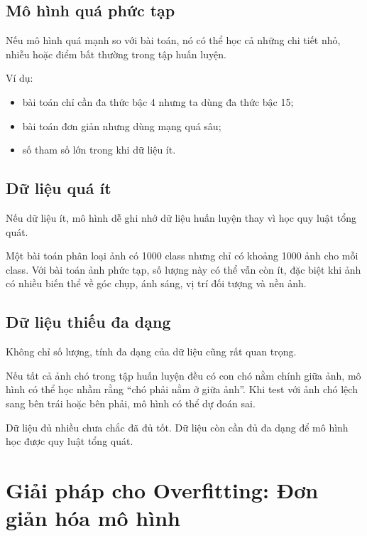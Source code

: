\subsection{Mô hình quá phức tạp}

Nếu mô hình quá mạnh so với bài toán, nó có thể học cả những chi tiết nhỏ, nhiễu hoặc điểm bất thường trong tập huấn luyện.

Ví dụ:

\begin{itemize}
    \item bài toán chỉ cần đa thức bậc 4 nhưng ta dùng đa thức bậc 15;
    \item bài toán đơn giản nhưng dùng mạng quá sâu;
    \item số tham số lớn trong khi dữ liệu ít.
\end{itemize}

\subsection{Dữ liệu quá ít}

Nếu dữ liệu ít, mô hình dễ ghi nhớ dữ liệu huấn luyện thay vì học quy luật tổng quát.

\begin{vidu}
Một bài toán phân loại ảnh có 1000 class nhưng chỉ có khoảng 1000 ảnh cho mỗi class. Với bài toán ảnh phức tạp, số lượng này có thể vẫn còn ít, đặc biệt khi ảnh có nhiều biến thể về góc chụp, ánh sáng, vị trí đối tượng và nền ảnh.
\end{vidu}

\subsection{Dữ liệu thiếu đa dạng}

Không chỉ số lượng, tính đa dạng của dữ liệu cũng rất quan trọng.

Nếu tất cả ảnh chó trong tập huấn luyện đều có con chó nằm chính giữa ảnh, mô hình có thể học nhầm rằng ``chó phải nằm ở giữa ảnh''. Khi test với ảnh chó lệch sang bên trái hoặc bên phải, mô hình có thể dự đoán sai.

\begin{ghinho}
Dữ liệu đủ nhiều chưa chắc đã đủ tốt. Dữ liệu còn cần đủ đa dạng để mô hình học được quy luật tổng quát.
\end{ghinho}

\section{Giải pháp cho Overfitting: Đơn giản hóa mô hình}

